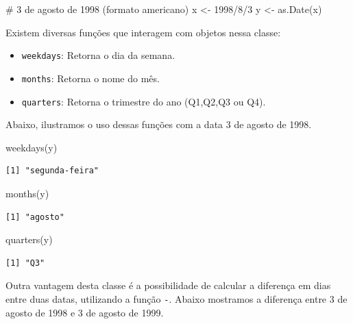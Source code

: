 \documentclass[
  letterpaper,
  DIV=11,
  numbers=noendperiod]{scrartcl}
\newenvironment{Shaded}{\begin{snugshade}}{\end{snugshade}}
\newcommand{\CommentTok}[1]{\textcolor[rgb]{0.37,0.37,0.37}{#1}}
\newcommand{\FunctionTok}[1]{\textcolor[rgb]{0.28,0.35,0.67}{#1}}
\newcommand{\NormalTok}[1]{\textcolor[rgb]{0.00,0.23,0.31}{#1}}
\newcommand{\OtherTok}[1]{\textcolor[rgb]{0.00,0.23,0.31}{#1}}
\newcommand{\StringTok}[1]{\textcolor[rgb]{0.13,0.47,0.30}{#1}}
\theoremstyle{definition}
\theoremstyle{definition}
\theoremstyle{plain}
\theoremstyle{plain}
\theoremstyle{remark}
\begin{document}
\begin{Shaded}
\begin{Highlighting}[]
\CommentTok{\# 3 de agosto de 1998 (formato americano)}
\NormalTok{x }\OtherTok{\textless{}{-}} \StringTok{\textquotesingle{}1998/8/3\textquotesingle{}}
\NormalTok{y }\OtherTok{\textless{}{-}} \FunctionTok{as.Date}\NormalTok{(x)}
\end{Highlighting}
\end{Shaded}

Existem diversas funções que interagem com objetos nessa classe:

\begin{itemize}
\item
  \texttt{weekdays}: Retorna o dia da semana.
\item
  \texttt{months}: Retorna o nome do mês.
\item
  \texttt{quarters}: Retorna o trimestre do ano (Q1,Q2,Q3 ou Q4).
\end{itemize}

Abaixo, ilustramos o uso dessas funções com a data 3 de agosto de 1998.

\begin{Shaded}
\begin{Highlighting}[]
\FunctionTok{weekdays}\NormalTok{(y)}
\end{Highlighting}
\end{Shaded}

\begin{verbatim}
[1] "segunda-feira"
\end{verbatim}

\begin{Shaded}
\begin{Highlighting}[]
\FunctionTok{months}\NormalTok{(y)}
\end{Highlighting}
\end{Shaded}

\begin{verbatim}
[1] "agosto"
\end{verbatim}

\begin{Shaded}
\begin{Highlighting}[]
\FunctionTok{quarters}\NormalTok{(y)}
\end{Highlighting}
\end{Shaded}

\begin{verbatim}
[1] "Q3"
\end{verbatim}

Outra vantagem desta classe é a possibilidade de calcular a diferença em
dias entre duas datas, utilizando a função \texttt{-}. Abaixo mostramos
a diferença entre 3 de agosto de 1998 e 3 de agosto de 1999.
\end{document}
